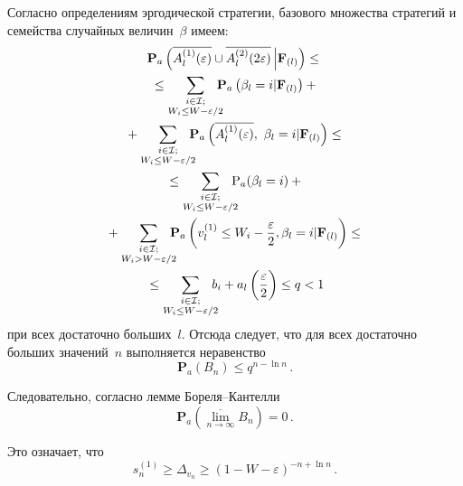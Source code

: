 \begin{multicols}{2}
  Согласно определениям эргодической стратегии, базового множества стратегий и 
семейства случайных величин~$\beta$ имеем:
  \begin{multline*}
  \mathbf{P}_{a} \left( \overline{A_l^{(1)}(\varepsilon)}\cup\overline{A_l^{(2)} 
(2\varepsilon)}\,\Big\vert \mathbf{F}_{(l)}\right)\leq{}\\
  {}\leq
  \sum\limits_{\substack{{i\in \mathcal{I};}\\ {W_i\leq W-\varepsilon/2}}}\!\!\!\!
   \mathbf{P}_{a}\left(\beta_l=i\vert 
\mathbf{F}_{(l)}\right)+{}\\
{}+  %
\sum\limits_{\substack{{i\in \mathcal{I};}\\ {W_i\leq W-\varepsilon/2}}}\!\!\!\!
\mathbf{P}_{a}\left( \overline{A_l^{(1)}(\varepsilon)}, \ \beta_l=i
\vert \mathbf{F}_{(l)}\right)\leq{}\\
  {}\leq \sum\limits_{\substack{{i\in \mathcal{I};}\\ {W_i\leq W-\varepsilon/2}}}\!\!\!\!
  \mathrm{P}_{a}(\beta_l=i)+{}\\
{}+\sum\limits_{\substack{{i\in \mathcal{I};}\\ {W_i> W-
\varepsilon/2}}}
\!\!\!\!\mathbf{P}_{a}\left( v_l^{(1)}\leq W_i-\fr{\varepsilon}{2}, \beta_l=i\vert 
\mathbf{F}_{(l)}\right) \leq{}\\
  {}\leq \sum\limits_{\substack{{i\in \mathcal{I};}\\ {W_i\leq W-\varepsilon/2}}}\!\!\!\!
   b_i+a_l\left( 
\fr{\varepsilon}{2}\right) \leq q<1
  \end{multline*}
при всех достаточно больших~$l$. Отсюда следует, что для всех достаточно больших 
значений~$n$ выполняется неравенство
$$
\mathbf{P}_a(B_n)\leq q^{n-\ln n}\,.
$$
  
  Следовательно, согласно лемме Бо\-ре\-ля--Кан\-тел\-ли
  \begin{equation}
  \mathbf{P}_{a}\left( \overline{\lim\limits_{n\rightarrow\infty}} B_n\right)=0\,.
  \label{e2-kon}
  \end{equation}
  
  Это означает, что
  $$
  s_n^{(1)}\geq \Delta_{v_n}\geq (1-W-\varepsilon)^{-n+\ln n}\,.
  $$
  

\end{multicols}

